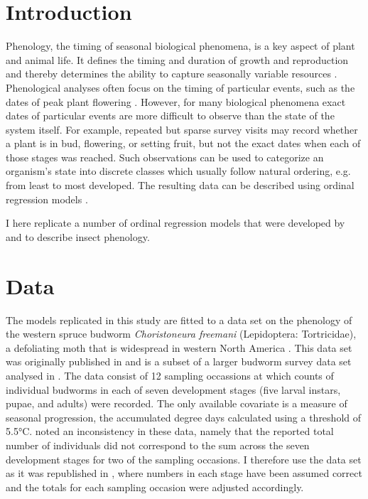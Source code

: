 \section{Introduction}

Phenology, the timing of seasonal biological phenomena, is a key aspect of plant and animal life.
It defines the timing and duration of growth and reproduction and thereby determines the ability to capture seasonally variable resources \citep{chuine2017process}.
Phenological analyses often focus on the timing of particular events, such as the dates of peak plant flowering \citep{aono2008phenological}.
However, for many biological phenomena exact dates of particular events are more difficult to observe than the state of the system itself.
For example, repeated but sparse survey visits may record whether a plant is in bud, flowering, or setting fruit, but not the exact dates when each of those stages was reached.
Such observations can be used to categorize an organism's state into discrete classes which usually follow natural ordering, e.g. from least to most developed. 
The resulting data can be described using ordinal regression models \cite{mccullagh1980regression,agresti2010analysis}.

I here replicate a number of ordinal regression models that were developed by \citet{dennis1986stochastic} and \citet{candy1991modeling} to describe insect phenology. 

\section{Data}
\label{sec:data}
The models replicated in this study are fitted to a data set on the phenology of the western spruce budworm \emph{Choristoneura freemani} (Lepidoptera: Tortricidae), a defoliating moth that is widespread in western North America \citep{brookes1987western}.
This data set was originally published in \citep{dennis1986stochastic} and is a subset of a larger budworm survey data set analysed in \citep{kemp1986stochastic}. 
The data consist of 12 sampling occassions at which counts of individual budworms in each of seven development stages (five larval instars, pupae, and adults) were recorded. 
The only available covariate is a measure of seasonal progression, the accumulated degree days calculated using a threshold of 5.5°C. 
\citet{candy1991modeling} noted an inconsistency in these data, namely that the reported total number of individuals did not correspond to the sum across the seven development stages for two of the sampling occasions. 
I therefore use the data set as it was republished in \citep{candy1990biology}, where numbers in each stage have been assumed correct and the totals for each sampling occasion were adjusted accordingly.

